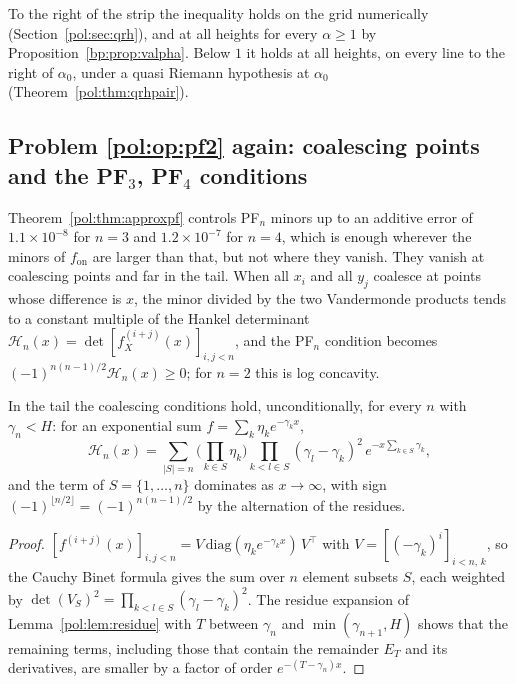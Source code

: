 To the right of the strip the inequality holds on the grid numerically (Section~\ref{pol:sec:qrh}), and at all heights for every $\alpha\ge1$ by Proposition~\ref{bp:prop:valpha}. Below $1$ it holds at all heights, on every line to the right of $\alpha_0$, under a quasi Riemann hypothesis at $\alpha_0$ (Theorem~\ref{pol:thm:qrhpair}).

\subsection{Problem \ref{pol:op:pf2} again: coalescing points and the PF$_3$, PF$_4$ conditions}

Theorem~\ref{pol:thm:approxpf} controls PF$_n$ minors up to an additive error of $1.1\times10^{-8}$ for $n=3$ and $1.2\times10^{-7}$ for $n=4$, which is enough wherever the minors of $f_{\mathrm{on}}$ are larger than that, but not where they vanish. They vanish at coalescing points and far in the tail. When all $x_i$ and all $y_j$ coalesce at points whose difference is $x$, the minor divided by the two Vandermonde products tends to a constant multiple of the Hankel determinant $\mathcal H_n(x)=\det[f_X^{(i+j)}(x)]_{i,j<n}$, and the PF$_n$ condition becomes $(-1)^{n(n-1)/2}\mathcal H_n(x)\ge0$; for $n=2$ this is log concavity.

\begin{proposition}\label{pol:prop:hankel}
In the tail the coalescing conditions hold, unconditionally, for every $n$ with $\gamma_n<H$: for an exponential sum $f=\sum_k\eta_ke^{-\gamma_kx}$,
\[
\mathcal H_n(x)=\sum_{|S|=n}\Big(\prod_{k\in S}\eta_k\Big)\prod_{k<l\in S}(\gamma_l-\gamma_k)^2\,e^{-x\sum_{k\in S}\gamma_k},
\]
and the term of $S=\{1,\dots,n\}$ dominates as $x\to\infty$, with sign $(-1)^{\lfloor n/2\rfloor}=(-1)^{n(n-1)/2}$ by the alternation of the residues.
\end{proposition}

\begin{proof}
$[f^{(i+j)}(x)]_{i,j<n}=V\,\mathrm{diag}(\eta_ke^{-\gamma_kx})\,V^{\top}$ with $V=[(-\gamma_k)^i]_{i<n,\,k}$, so the Cauchy Binet formula gives the sum over $n$ element subsets $S$, each weighted by $\det(V_S)^2=\prod_{k<l\in S}(\gamma_l-\gamma_k)^2$. The residue expansion of Lemma~\ref{pol:lem:residue} with $T$ between $\gamma_n$ and $\min(\gamma_{n+1},H)$ shows that the remaining terms, including those that contain the remainder $E_T$ and its derivatives, are smaller by a factor of order $e^{-(T-\gamma_n)x}$.
\end{proof}

